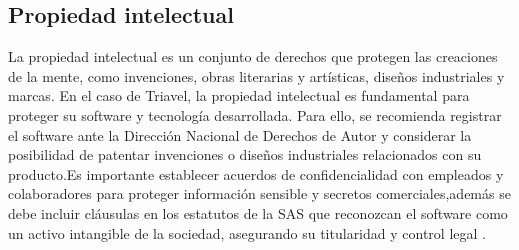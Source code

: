 \subsection*{Propiedad intelectual}
La propiedad intelectual es un conjunto de derechos que protegen las creaciones de la mente, como invenciones, obras literarias y artísticas, diseños industriales y marcas. En el caso de Triavel, la propiedad intelectual es fundamental para proteger su software y tecnología desarrollada. Para ello, se recomienda registrar el software ante la Dirección Nacional de Derechos de Autor y considerar la posibilidad de patentar invenciones o diseños industriales relacionados con su producto.Es importante establecer acuerdos de confidencialidad con empleados y colaboradores para proteger información sensible y secretos comerciales,además se debe incluir cláusulas en los estatutos de la SAS que reconozcan el software como un activo intangible de la sociedad, asegurando su titularidad y control legal .
